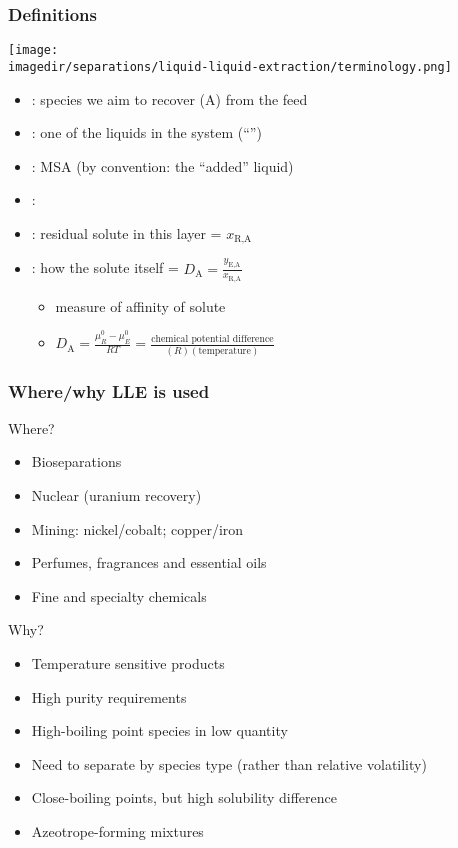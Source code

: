 \begin{frame}\frametitle{Definitions}
	\begin{center}
		\texttt{[image: \\imagedir/separations/liquid-liquid-extraction/terminology.png]}
	\end{center}
	
	\begin{itemize}
		\item	{\color{purple}{solute}}: species we aim to recover (A) from the feed 
		\item	{\color{purple}{feed or ``feed solvent''}}: one of the liquids in the system {\tiny (``{\color{purple}{carrier}}'')}
		\item	{\color{purple}{solvent}}: MSA (by convention: the ``added'' liquid)
		\item	{\color{purple}{extract}}: {}
		\item	{\color{purple}{raffinate}}: residual solute in this layer = $x_\text{R,A}$
		\item	{\color{purple}{distribution}}: how the solute {\color{purple}{partitions}} itself = $D_\text{A} = \displaystyle \frac{y_\text{E,A}}{x_\text{R,A}}$
			\begin{itemize}
				\item	measure of affinity of solute
				\item	$D_\text{A} = \displaystyle \frac{\mu_R^0 - \mu_E^0}{RT} = \displaystyle \frac{\text{chemical potential difference}}{(R)(\text{temperature})}$	%
			\end{itemize}
	\end{itemize}	
\end{frame}

\begin{frame}\frametitle{Where/why LLE is used}
	Where?
	\begin{itemize}
		\item	Bioseparations
		\item	Nuclear (uranium recovery)
		\item	Mining: nickel/cobalt; copper/iron
		\item	Perfumes, fragrances and essential oils
		\item	Fine and specialty chemicals
	\end{itemize}
	Why?
	\begin{itemize}
		\item	Temperature sensitive products
		\item	High purity requirements
		\item	High-boiling point species in low quantity
		\item	Need to separate by species type (rather than relative volatility)
		\item	Close-boiling points, but high solubility difference
		\item	Azeotrope-forming mixtures
	\end{itemize}
\end{frame}

